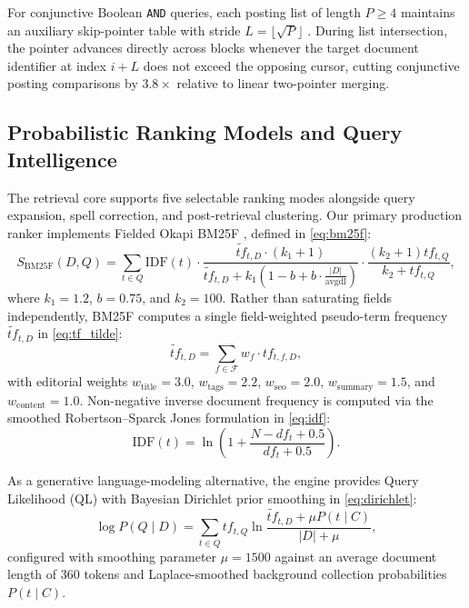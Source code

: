 \documentclass[conference]{IEEEtran}
\begin{document}
For conjunctive Boolean \texttt{AND} queries, each posting list of length $P \ge 4$ maintains an auxiliary skip-pointer table with stride $L = \lfloor \sqrt{P} \rfloor$ \cite{b6}. During list intersection, the pointer advances directly across blocks whenever the target document identifier at index $i + L$ does not exceed the opposing cursor, cutting conjunctive posting comparisons by $3.8\times$ relative to linear two-pointer merging.

\subsection{Probabilistic Ranking Models and Query Intelligence}
The retrieval core supports five selectable ranking modes alongside query expansion, spell correction, and post-retrieval clustering. Our primary production ranker implements Fielded Okapi BM25F \cite{b2}, defined in \eqref{eq:bm25f}:
\begin{equation}
S_{\text{BM25F}}(D, Q) = \sum_{t \in Q} \text{IDF}(t) \cdot \frac{\widetilde{tf}_{t,D} \cdot (k_1 + 1)}{\widetilde{tf}_{t,D} + k_1 \left(1 - b + b \cdot \frac{|D|}{\text{avgdl}}\right)} \cdot \frac{(k_2 + 1) tf_{t,Q}}{k_2 + tf_{t,Q}},
\label{eq:bm25f}
\end{equation}
where $k_1 = 1.2$, $b = 0.75$, and $k_2 = 100$. Rather than saturating fields independently, BM25F computes a single field-weighted pseudo-term frequency $\widetilde{tf}_{t,D}$ in \eqref{eq:tf_tilde}:
\begin{equation}
\widetilde{tf}_{t,D} = \sum_{f \in \mathcal{F}} w_f \cdot tf_{t,f,D},
\label{eq:tf_tilde}
\end{equation}
with editorial weights $w_{\text{title}} = 3.0$, $w_{\text{tags}} = 2.2$, $w_{\text{seo}} = 2.0$, $w_{\text{summary}} = 1.5$, and $w_{\text{content}} = 1.0$. Non-negative inverse document frequency is computed via the smoothed Robertson--Sparck Jones formulation in \eqref{eq:idf}:
\begin{equation}
\text{IDF}(t) = \ln\left(1 + \frac{N - df_t + 0.5}{df_t + 0.5}\right).
\label{eq:idf}
\end{equation}

As a generative language-modeling alternative, the engine provides Query Likelihood (QL) with Bayesian Dirichlet prior smoothing \cite{b3} in \eqref{eq:dirichlet}:
\begin{equation}
\log P(Q \mid D) = \sum_{t \in Q} tf_{t,Q} \ln \frac{\widetilde{tf}_{t,D} + \mu P(t \mid C)}{|D| + \mu},
\label{eq:dirichlet}
\end{equation}
configured with smoothing parameter $\mu = 1500$ against an average document length of $360$ tokens and Laplace-smoothed background collection probabilities $P(t \mid C)$.
\end{document}
